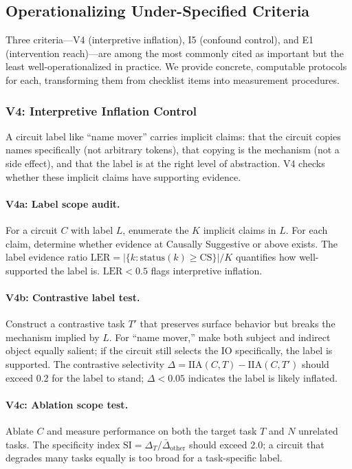 \documentclass[10pt]{article}
\begin{document}
\subsection{Operationalizing Under-Specified Criteria}
\label{sec:protocols}

Three criteria---V4 (interpretive inflation), I5 (confound control), and E1 (intervention reach)---are among the most commonly cited as important but the least well-operationalized in practice. We provide concrete, computable protocols for each, transforming them from checklist items into measurement procedures.

\subsubsection{V4: Interpretive Inflation Control}

A circuit label like ``name mover'' carries implicit claims: that the circuit copies names specifically (not arbitrary tokens), that copying is the mechanism (not a side effect), and that the label is at the right level of abstraction. V4 checks whether these implicit claims have supporting evidence.

\paragraph{V4a: Label scope audit.} For a circuit $C$ with label $L$, enumerate the $K$ implicit claims in $L$. For each claim, determine whether evidence at Causally Suggestive or above exists. The label evidence ratio $\text{LER} = |\{k : \text{status}(k) \geq \text{CS}\}| / K$ quantifies how well-supported the label is. $\text{LER} < 0.5$ flags interpretive inflation.

\paragraph{V4b: Contrastive label test.} Construct a contrastive task $T'$ that preserves surface behavior but breaks the mechanism implied by $L$. For ``name mover,'' make both subject and indirect object equally salient; if the circuit still selects the IO specifically, the label is supported. The contrastive selectivity $\Delta = \text{IIA}(C, T) - \text{IIA}(C, T')$ should exceed 0.2 for the label to stand; $\Delta < 0.05$ indicates the label is likely inflated.

\paragraph{V4c: Ablation scope test.} Ablate $C$ and measure performance on both the target task $T$ and $N$ unrelated tasks. The specificity index $\text{SI} = \Delta_T / \bar{\Delta}_{\text{other}}$ should exceed 2.0; a circuit that degrades many tasks equally is too broad for a task-specific label.
\end{document}

